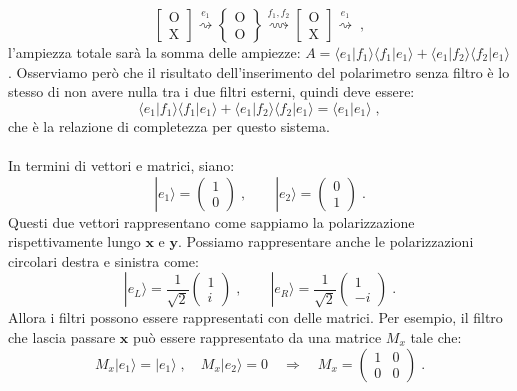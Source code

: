 \documentclass[10pt,a4paper]{report}
\theoremstyle{definition}
\numberwithin{equation}{section}
\newcommand{\bra}{\langle}
\newcommand{\ket}{\rangle}
\begin{document}
$$
\left[\begin{matrix}
\mathrm{O} \\
\mathrm{X}
\end{matrix}\right] \stackrel{e_1}{\rightsquigarrow}
\left\{\begin{matrix}
\mathrm{O} \\
\mathrm{O}
\end{matrix}\right\} \stackrel{f_1,f_2}{\rightsquigarrow}
\left[\begin{matrix}
\mathrm{O} \\
\mathrm{X}
\end{matrix}\right] \stackrel{e_1}{\rightsquigarrow}\;,
$$
l'ampiezza totale sarà la somma delle ampiezze: $A=\bra e_1|f_1\ket\bra f_1|e_1\ket+\bra e_1|f_2\ket\bra f_2|e_1\ket$. Osserviamo però che il risultato dell'inserimento del polarimetro senza filtro è lo stesso di non avere nulla tra i due filtri esterni, quindi deve essere:
$$
\bra e_1|f_1\ket\bra f_1|e_1\ket+\bra e_1|f_2\ket\bra f_2|e_1\ket=\bra e_1|e_1\ket\;,
$$
che è la relazione di completezza per questo sistema. \\
\\
In termini di vettori e matrici, siano:
$$
|e_1\ket=\left(
\begin{matrix}
1 \\
0
\end{matrix}\right)\;, \qquad
|e_2\ket=\left(
\begin{matrix}
0 \\
1
\end{matrix}\right)\;.
$$
Questi due vettori rappresentano come sappiamo la polarizzazione rispettivamente lungo $\mathbf{x}$ e $\mathbf{y}$. Possiamo rappresentare anche le polarizzazioni circolari destra e sinistra come:
$$
|e_L\ket=\frac{1}{\sqrt{2}}\left(
\begin{matrix}
1 \\
i
\end{matrix}\right)\;,\qquad
|e_R\ket=\frac{1}{\sqrt{2}}\left(
\begin{matrix}
1 \\
-i
\end{matrix}\right)\;.
$$
Allora i filtri possono essere rappresentati con delle matrici. Per esempio, il filtro che lascia passare $\mathbf{x}$ può essere rappresentato da una matrice $M_x$ tale che:
$$
M_x|e_1\ket=|e_1\ket\;,\quad M_x|e_2\ket=0 \quad \Longrightarrow\quad
M_x=\left(
\begin{matrix}
1 & 0 \\
0 & 0
\end{matrix}\right)\;.
$$
\end{document}
